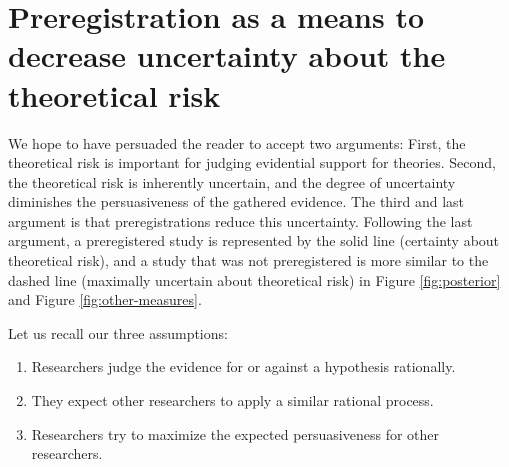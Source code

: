 \documentclass[jou,a4paper]{apa7}
\begin{document}
\section{Preregistration as a means to decrease uncertainty about the theoretical risk} 

We hope to have persuaded the reader to accept two arguments: First, the theoretical risk is important for judging evidential support for theories.
Second, the theoretical risk is inherently uncertain, and the degree of uncertainty diminishes the persuasiveness of the gathered evidence.
The third and last argument is that preregistrations reduce this uncertainty.
Following the last argument, a preregistered study is represented by the solid line (certainty about theoretical risk), and a study that was not preregistered is more similar to the dashed line (maximally uncertain about theoretical risk) in Figure \ref{fig:posterior} and Figure \ref{fig:other-measures}.

Let us recall our three assumptions:

\begin{enumerate}
    \item Researchers judge the evidence for or against a hypothesis rationally.
    \item They expect other researchers to apply a similar rational process.
    \item Researchers try to maximize the expected persuasiveness for other researchers.
\end{enumerate}
\end{document}

